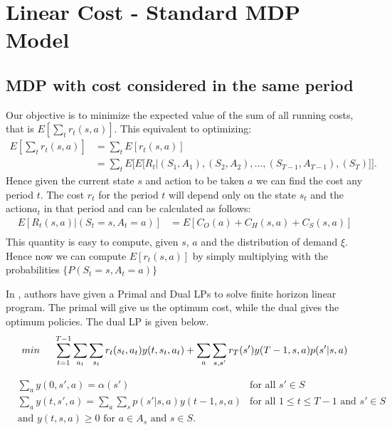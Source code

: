 \documentclass[11pt,a4paper,oneside]{report}
\begin{document}
\section{Linear Cost - Standard MDP Model}
\subsection{MDP with cost considered in the same period}
Our objective is to minimize the expected value of the sum of all running costs, that is $E[\sum_t r_t(s,a) ]$.
This equivalent to optimizing:
\begin{align}
E[\sum_t r_t(s,a) ]&=\sum_t E[r_t(s,a)] \\
&= \sum_t E \bigg[ E\Big[{R_t}|{(S_1,A_1),(S_2,A_2),...,(S_{T-1},A_{T-1}),(S_T)}\Big]\bigg].
\end{align}
\noindent Hence given the current state $s$ and action to be taken $a$ we can find the cost any period $t$. The  cost $r_t$ for the period $t$ will depend only on the state $s_t$ and the action$a_t$ in that period and can be calculated as follows:
\begin{align*}
\nonumber
E[R_t(s,a)|{(S_t=s,A_t=a)}] &=  E[C_O(a) + C_H(s,a) + C_S(s,a)]\\
\end{align*}
This quantity is easy to compute, given $s$, $a$ and the distribution of demand $\xi$.
Hence now we can compute $E[r_t(s,a)]$ by simply multiplying with the probabilities $\lbrace P( S_t=s, A_t=a)\rbrace$

In \citep{kumar2015finite}, authors have given a Primal and Dual LPs to solve finite horizon linear program. The primal will give us the optimum cost, while the dual gives the optimum policies. The dual LP is given below.\\
\begin{align*}
\nonumber
min\hspace{0.5cm} \sum_{t=1}^{T-1} \sum_{a_t} \sum_{s_t} r_t(s_t,a_t)y(t,s_t,a_t) + \sum_{a} \sum_{s,s'}r_T(s')y(T-1,s,a)p(s'|s,a)
\end{align*}
\begin{flushleft}
\end{flushleft}
\begin{align*}
&\sum_a y(0,s',a)=\alpha(s')     &\text{for all } s'\in S \\
&\sum_a y(t,s',a)= \sum_a \sum_s p(s'|s,a)y(t-1,s,a)    &\text{for all } 1\leq t\leq T-1 \text{ and } s'\in S   \\ 
&\text{and } y(t,s,a)\geq 0 \text{ for } a\in A_s \text{ and } s\in S. 
\end{align*}
\end{document}
